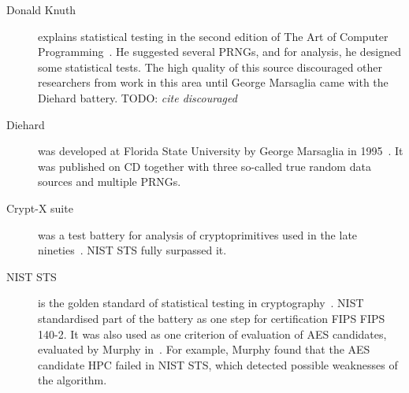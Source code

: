 \documentclass[
  print, %
  Table,   %
  nolof,     %
  nolot,     %
  11pt, %
  oneside  %
]{fithesis3}
\newcommand{\todo}[1]{TODO: \textit{#1}}
\begin{document}

\begin{description}
    \item[Donald Knuth] explains statistical testing in the second edition of The Art of Computer Programming~\cite{knuth1969vol}. He suggested several PRNGs, and for analysis, he designed some statistical tests. The high quality of this source discouraged other researchers from work in this area until George Marsaglia came with the Diehard battery. \todo{cite discouraged} %
    \item[Diehard] was developed at Florida State University by George Marsaglia in 1995~\cite{marsaglia1996diehard}. It was published on CD together with three so-called true random data sources and multiple PRNGs. %
    \item[Crypt-X suite] was a test battery for analysis of cryptoprimitives used in the late nineties~\cite{cryptxs}. NIST STS fully surpassed it. %
    \item[NIST STS] is the golden standard of statistical testing in cryptography~\cite{rukhin2001statistical}. NIST standardised part of the battery as one step for certification FIPS FIPS 140-2. It was also used as one criterion of evaluation of AES candidates, evaluated by Murphy in~\cite{murphy2000power}. For example, Murphy found that the AES candidate HPC failed in NIST STS, which detected possible weaknesses of the algorithm.


\end{description}
\end{document}
